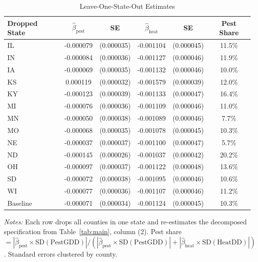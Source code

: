 \begin{table}[htbp]
\centering
\begin{threeparttable}
\caption{Leave-One-State-Out Estimates}
\label{tab:loo}
\begin{tabular}{lccccc}
\toprule
Dropped State & $\hat{\beta}_{\text{pest}}$ & SE & $\hat{\beta}_{\text{heat}}$ & SE & Pest Share \\
\midrule
IL & -0.000079 & (0.000035) & -0.001104 & (0.000045) & 11.5\% \\
IN & -0.000084 & (0.000036) & -0.001127 & (0.000046) & 11.9\% \\
IA & -0.000069 & (0.000035) & -0.001132 & (0.000046) & 10.0\% \\
KS & 0.000119 & (0.000032) & -0.001579 & (0.000039) & 12.0\% \\
KY & -0.000123 & (0.000039) & -0.001133 & (0.000047) & 16.4\% \\
MI & -0.000076 & (0.000036) & -0.001109 & (0.000046) & 11.0\% \\
MN & -0.000050 & (0.000038) & -0.001089 & (0.000046) & 7.7\% \\
MO & -0.000068 & (0.000035) & -0.001078 & (0.000045) & 10.3\% \\
NE & -0.000037 & (0.000037) & -0.001100 & (0.000047) & 5.7\% \\
ND & -0.000145 & (0.000026) & -0.001037 & (0.000042) & 20.2\% \\
OH & -0.000097 & (0.000037) & -0.001122 & (0.000048) & 13.6\% \\
SD & -0.000072 & (0.000038) & -0.001095 & (0.000046) & 10.6\% \\
WI & -0.000077 & (0.000036) & -0.001107 & (0.000046) & 11.2\% \\
\midrule
Baseline & -0.000071 & (0.000034) & -0.001124 & (0.000045) & 10.3\% \\
\bottomrule
\end{tabular}
\begin{tablenotes}[flushleft]
\footnotesize
\item \textit{Notes:} Each row drops all counties in one state and re-estimates the decomposed specification from Table~\ref{tab:main}, column (2). Pest share $= |\hat{\beta}_{\text{pest}} \times \text{SD}(\text{PestGDD})| / (|\hat{\beta}_{\text{pest}} \times \text{SD}(\text{PestGDD})| + |\hat{\beta}_{\text{heat}} \times \text{SD}(\text{HeatDD})|)$. Standard errors clustered by county.
\end{tablenotes}
\end{threeparttable}
\end{table}
